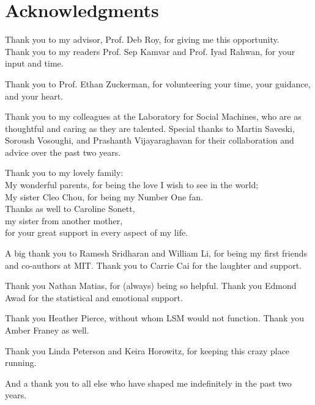  
\section*{Acknowledgments}

Thank you to my advisor, Prof. Deb Roy, for giving me this opportunity.\\
Thank you to my readers Prof. Sep Kamvar and Prof. Iyad Rahwan, for your input and time.

Thank you to Prof. Ethan Zuckerman, for volunteering your time, your guidance, and your heart. 

Thank you to my colleagues at the Laboratory for Social Machines, who are as thoughtful and caring as they are talented. Special thanks to Martin Saveski, Soroush Vosoughi, and Prashanth Vijayaraghavan for their collaboration and advice over the past two years.


Thank you to my lovely family: \\
My wonderful parents, for being the love I wish to see in the world;  \\
My sister Cleo Chou, for being my Number One fan.  \\
Thanks as well to Caroline Sonett, \\
my sister from another mother, \\
for your great support in every aspect of my life.
  
A big thank you to Ramesh Sridharan and William Li, for being my first friends and co-authors at MIT. Thank you to Carrie Cai for the laughter and support.

Thank you Nathan Matias, for (always) being so helpful. Thank you Edmond Awad for the statistical and emotional support.

Thank you Heather Pierce, without whom LSM would not function. Thank you Amber Franey as well.

Thank you Linda Peterson and Keira Horowitz, for keeping this crazy place running.

And a thank you to all else who have shaped me indefinitely in the past two years.

 
\afterpage{\blankpage}


